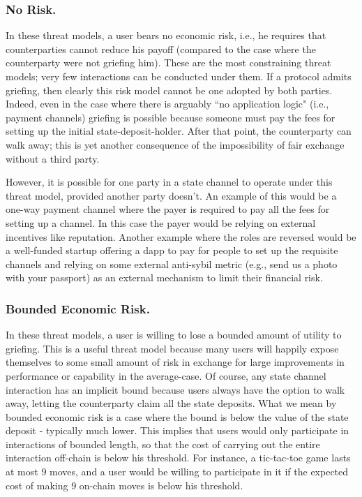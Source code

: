 \documentclass[prb,floatfix,reprint,nofootinbib,amsmath,amssymb,epsfig,pre,floats,letterpaper,groupedaffiliation,tightenlines,allcolors=blue,11pt]{revtex4}
\theoremstyle{definition}
\theoremstyle{definition}
\theoremstyle{definition}
\begin{document}
\subsubsection{No Risk.} In these threat models, a user bears no economic risk, i.e., he requires that counterparties cannot reduce his payoff (compared to the case where the counterparty were not griefing him). These are the most constraining threat models; very few interactions can be conducted under them. If a protocol admits griefing, then clearly this risk model cannot be one adopted by both parties. Indeed, even in the case where there is arguably ``no application logic" (i.e., payment channels) griefing is possible because someone must pay the fees for setting up the initial state-deposit-holder. After that point, the counterparty can walk away; this is yet another consequence of the impossibility of fair exchange without a third party.

However, it is possible for one party in a state channel to operate under this threat model, provided another party doesn't. An example of this would be a one-way payment channel where the payer is required to pay all the fees for setting up a channel. In this case the payer would be relying on external incentives like reputation. Another example where the roles are reversed would be a well-funded startup offering a dapp to pay for people to set up the requisite channels and relying on some external anti-sybil metric (e.g., send us a photo with your passport) as an external mechanism to limit their financial risk.

\subsubsection{Bounded Economic Risk.} In these threat models, a user is willing to lose a bounded amount of utility to griefing. This is a useful threat model because many users will happily expose themselves to some small amount of risk in exchange for large improvements in performance or capability in the average-case. Of course, any state channel interaction has an implicit bound because users always have the option to walk away, letting the counterparty claim all the state deposits. What we mean by bounded economic risk is a case where the bound is below the value of the state deposit - typically much lower. This implies that users would only participate in interactions of bounded length, so that the cost of carrying out the entire interaction off-chain is below his threshold. For instance, a tic-tac-toe game lasts at most 9 moves, and a user would be willing to participate in it if the expected cost of making 9 on-chain moves is below his threshold.
\end{document}

